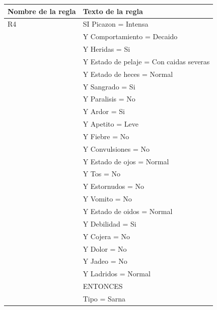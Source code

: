 \documentclass[a4paper,table,xcdraw]{article}
\begin{document}
\begin{table}[H]
\centering
\begin{tabular}{|l|l|}
\hline
\textbf{Nombre de la regla} & Texto de la regla \\ \hline
R4 & SI Picazon = Intensa \\
  & Y Comportamiento = Decaido \\
  & Y Heridas = Si \\
  & Y Estado de pelaje = Con caidas severas \\
  & Y Estado de heces = Normal \\
  & Y Sangrado = Si \\
  & Y Paralisis = No \\
  & Y Ardor = Si \\
  & Y Apetito = Leve \\
  & Y Fiebre = No \\
  & Y Convulsiones = No \\
  & Y Estado de ojos = Normal \\
  & Y Tos = No \\
  & Y Estornudos = No \\
  & Y Vomito = No \\
  & Y Estado de oidos = Normal \\
  & Y Debilidad = Si \\
  & Y Cojera = No \\
  & Y Dolor = No \\
  & Y Jadeo = No \\
  & Y Ladridos = Normal \\
  &   ENTONCES \\
  & Tipo = Sarna \\ \hline
\end{tabular}
\end{table}
  
\end{document}
